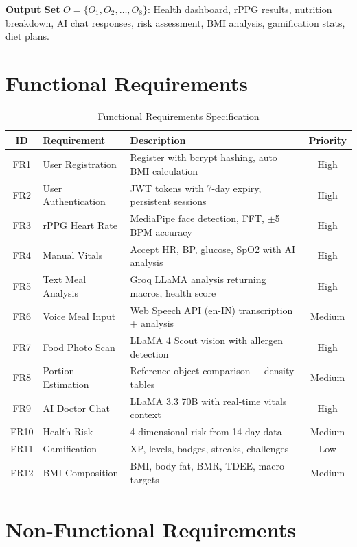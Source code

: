 \documentclass[12pt,a4paper]{report}
\begin{document}
\textbf{Output Set} $O = \{O_1, O_2, \ldots, O_8\}$: Health dashboard, rPPG results, nutrition breakdown, AI chat responses, risk assessment, BMI analysis, gamification stats, diet plans.

\section{Functional Requirements}

\begin{table}[H]
\centering
\caption{Functional Requirements Specification}
\label{tab:funcreq}
\small
\begin{tabular}{|c|p{3cm}|p{7cm}|c|}
\hline
\textbf{ID} & \textbf{Requirement} & \textbf{Description} & \textbf{Priority} \\
\hline
FR1 & User Registration & Register with bcrypt hashing, auto BMI calculation & High \\
FR2 & User Authentication & JWT tokens with 7-day expiry, persistent sessions & High \\
FR3 & rPPG Heart Rate & MediaPipe face detection, FFT, $\pm$5 BPM accuracy & High \\
FR4 & Manual Vitals & Accept HR, BP, glucose, SpO2 with AI analysis & High \\
FR5 & Text Meal Analysis & Groq LLaMA analysis returning macros, health score & High \\
FR6 & Voice Meal Input & Web Speech API (en-IN) transcription + analysis & Medium \\
FR7 & Food Photo Scan & LLaMA 4 Scout vision with allergen detection & High \\
FR8 & Portion Estimation & Reference object comparison + density tables & Medium \\
FR9 & AI Doctor Chat & LLaMA 3.3 70B with real-time vitals context & High \\
FR10 & Health Risk & 4-dimensional risk from 14-day data & Medium \\
FR11 & Gamification & XP, levels, badges, streaks, challenges & Low \\
FR12 & BMI Composition & BMI, body fat, BMR, TDEE, macro targets & Medium \\
\hline
\end{tabular}
\end{table}

\section{Non-Functional Requirements}
\end{document}
